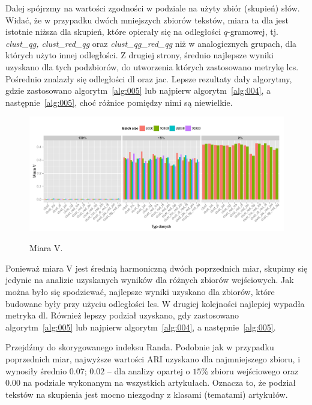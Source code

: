 \documentclass{praca1}
\begin{document}
Dalej spójrzmy na wartości zgodności w podziale na użyty zbiór (skupień) słów. Widać, że w przypadku dwóch mniejszych zbiorów tekstów, miara ta dla jest istotnie niższa dla skupień, które opierały się na odległości $q$-gramowej, tj. \emph{clust\_qg, clust\_red\_qg} oraz \emph{clust\_qg\_red\_qg} niż w analogicznych grupach, dla których użyto innej odległości. Z drugiej strony, średnio najlepsze wyniki uzyskano dla tych podzbiorów, do utworzenia których zastosowano metrykę lcs. Pośrednio znalazły się odległości dl oraz jac. Lepsze rezultaty dały algorytmy, gdzie zastosowano algorytm~\ref{alg:005} lub najpierw algorytm~\ref{alg:004}, a następnie~\ref{alg:005}, choć różnice pomiędzy nimi są niewielkie.

\begin{figure}[!h]
  \centering
  \includegraphics[width=400pt]{plot12.pdf}\\
  \caption{Miara V.}\label{plot:007}
\end{figure}

Ponieważ miara V jest średnią harmoniczną dwóch poprzednich miar, skupimy się jedynie na analizie uzyskanych wyników dla różnych zbiorów wejściowych. Jak można było się spodziewać, najlepsze wyniki uzyskano dla zbiorów, które budowane były przy użyciu odległości lcs. W drugiej kolejności najlepiej wypadła metryka dl. Również lepszy podział uzyskano, gdy zastosowano algorytm~\ref{alg:005} lub najpierw algorytm~\ref{alg:004}, a następnie~\ref{alg:005}. 

Przejdźmy do skorygowanego indeksu Randa. Podobnie jak w przypadku poprzednich miar, najwyższe wartości ARI uzyskano dla najmniejszego zbioru, i wynosiły średnio $0.07$; $0.02$ -- dla analizy opartej o $15\%$ zbioru wejściowego oraz $0.00$ na podziale wykonanym na wszystkich artykułach. Oznacza to, że podział tekstów na skupienia jest mocno niezgodny z klasami (tematami) artykułów. 
\end{document}
